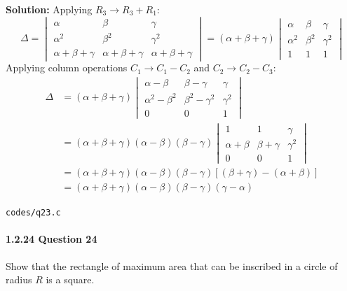 \documentclass{article}
\begin{document}
\textbf{Solution:} Applying $R_3 \to R_3 + R_1$:
\begin{equation}
\Delta = \begin{vmatrix} \alpha & \beta & \gamma \\ \alpha^2 & \beta^2 & \gamma^2 \\ \alpha+\beta+\gamma & \alpha+\beta+\gamma & \alpha+\beta+\gamma \end{vmatrix} = (\alpha + \beta + \gamma)\begin{vmatrix} \alpha & \beta & \gamma \\ \alpha^2 & \beta^2 & \gamma^2 \\ 1 & 1 & 1 \end{vmatrix}
\end{equation}
Applying column operations $C_1 \to C_1 - C_2$ and $C_2 \to C_2 - C_3$:
\begin{align}
\Delta &= (\alpha + \beta + \gamma)\begin{vmatrix} \alpha - \beta & \beta - \gamma & \gamma \\ \alpha^2 - \beta^2 & \beta^2 - \gamma^2 & \gamma^2 \\ 0 & 0 & 1 \end{vmatrix} \\
&= (\alpha + \beta + \gamma)(\alpha - \beta)(\beta - \gamma) \begin{vmatrix} 1 & 1 & \gamma \\ \alpha + \beta & \beta + \gamma & \gamma^2 \\ 0 & 0 & 1 \end{vmatrix} \\
&= (\alpha + \beta + \gamma)(\alpha - \beta)(\beta - \gamma)[(\beta + \gamma) - (\alpha + \beta)] \\
&= (\alpha + \beta + \gamma)(\alpha - \beta)(\beta - \gamma)(\gamma - \alpha)
\end{align}
\begin{tcolorbox}[colback=gray!10,colframe=black,width=\linewidth]
\texttt{codes/q23.c}
\end{tcolorbox}

\paragraph{1.2.24 Question 24}
Show that the rectangle of maximum area that can be inscribed in a circle of radius $R$ is a square.
\end{document}
